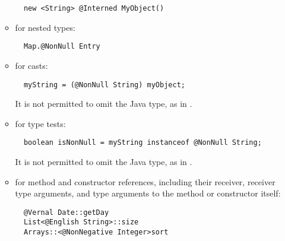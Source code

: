 \documentclass[10pt]{article}
\begin{document}
\begin{enumerate}
\begin{itemize}
\preverbnegspace
\begin{Verbatim}
  new <String> @Interned MyObject()
\end{Verbatim}

\item for nested types:
\preverbnegspace
\begin{Verbatim}
  Map.@NonNull Entry
\end{Verbatim}

\item for casts:
\preverbnegspace
\begin{Verbatim}
  myString = (@NonNull String) myObject;
\end{Verbatim}
\preverbnegspace
It is not permitted to omit the Java type, as in
.

\item for type tests:
\preverbnegspace
\begin{Verbatim}
  boolean isNonNull = myString instanceof @NonNull String;
\end{Verbatim}
\preverbnegspace
It is not permitted to omit the Java type, as in
.

\item for method and constructor references, including their receiver,
  receiver type arguments, and type arguments to the method or constructor
  itself:
\preverbnegspace
\begin{Verbatim}
  @Vernal Date::getDay
  List<@English String>::size
  Arrays::<@NonNegative Integer>sort
\end{Verbatim}



\end{itemize}


\end{enumerate}
\end{document}
